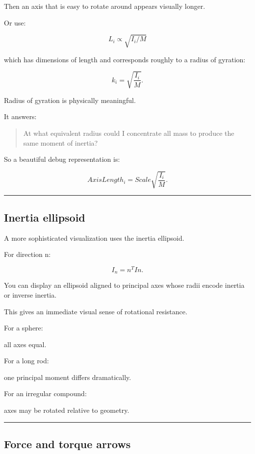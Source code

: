 Then an axis that is easy to rotate around appears visually longer.

Or use:

\[
L_i\propto\sqrt{I_i/M}
\]

which has dimensions of length and corresponds roughly to a radius of gyration:

\[
\boxed{
k_i
=
\sqrt{\frac{I_i}{M}}.
}
\]

Radius of gyration is physically meaningful.

It answers:

\begin{quote}
At what equivalent radius could I concentrate all mass to produce the same moment of inertia?
\end{quote}

So a beautiful debug representation is:

\[
AxisLength_i
=
Scale
\sqrt{\frac{I_i}{M}}.
\]

\begin{center}\rule{0.5\linewidth}{0.5pt}\end{center}

\subsection{Inertia ellipsoid}\label{06-engine-ii-ch039-inertia-ellipsoid}

A more sophisticated visualization uses the inertia ellipsoid.

For direction n:

\[
I_n=n^TIn.
\]

You can display an ellipsoid aligned to principal axes whose radii encode inertia or inverse inertia.

This gives an immediate visual sense of rotational resistance.

For a sphere:

all axes equal.

For a long rod:

one principal moment differs dramatically.

For an irregular compound:

axes may be rotated relative to geometry.

\begin{center}\rule{0.5\linewidth}{0.5pt}\end{center}

\subsection{Force and torque arrows}\label{06-engine-ii-ch039-force-and-torque-arrows}

